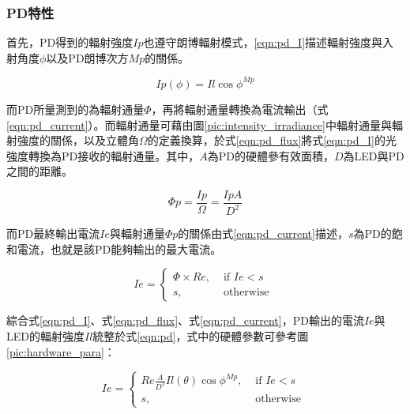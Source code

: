         \subsubsection{PD特性}
        \label{chp:PD}

        首先，PD得到的輻射強度$Ip$也遵守朗博輻射模式，\ref{eqn:pd_I}描述輻射強度與入射角度$\phi$以及PD朗博次方$Mp$的關係。

        \begin{equation}
            \label{eqn:pd_I}
            Ip(\phi) = Il \cos \phi^{Mp}
        \end{equation}

        而PD所量測到的為輻射通量$\Phi$，再將輻射通量轉換為電流輸出（式\ref{eqn:pd_current}）。而輻射通量可藉由圖\ref{pic:intensity_irradiance}中輻射通量與輻射強度的關係，以及立體角$\Omega$的定義換算，於式\ref{eqn:pd_flux}將式\ref{eqn:pd_I}的光強度轉換為PD接收的輻射通量。其中，$A$為PD的硬體參有效面積，$D$為LED與PD之間的距離。

        \begin{equation}
            \label{eqn:pd_flux}
            \Phi p = \frac{Ip}{\Omega} = \frac{IpA}{D^2}
        \end{equation}

        而PD最終輸出電流$Ie$與輻射通量$\Phi p$的關係由式\ref{eqn:pd_current}描述，$s$為PD的飽和電流，也就是該PD能夠輸出的最大電流。

        \begin{equation}
            \label{eqn:pd_current}
            Ie = \begin{cases}\Phi\times Re, & \text { if } Ie<s \\ s, & \text { otherwise }\end{cases}
        \end{equation}

        綜合式\ref{eqn:pd_I}、式\ref{eqn:pd_flux}、式\ref{eqn:pd_current}，PD輸出的電流$Ie$與LED的輻射強度$Il$統整於式\ref{eqn:pd}，式中的硬體參數可參考圖\ref{pic:hardware_para}：

        \begin{equation}
            \label{eqn:pd}
            Ie = \begin{cases}Re \frac{A}{D^2}Il(\theta) \cos \phi^{Mp}, & \text { if } Ie<s \\ s, & \text { otherwise }\end{cases}
        \end{equation}

        
        



